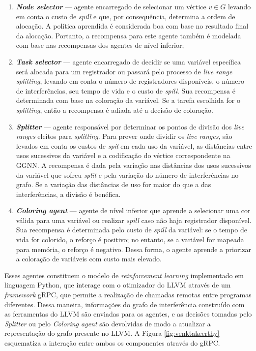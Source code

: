 \documentclass[
	12pt,				%
	openright,			%
	oneside,			%
	a4paper,			%
	tccpreliminar,			%
	]{ABNT-DC-UEL}
\begin{document}
\begin{enumerate}
    \item \textbf{\textit{Node selector}} --- agente encarregado de selecionar um vértice $v \in G$ levando em conta o custo de \textit{spill} e que, por consequência, determina a ordem de alocação. A política aprendida é considerada boa com base no resultado final da alocação. Portanto, a recompensa para este agente também é modelada com base nas recompensas dos agentes de nível inferior;

    \item \textbf{\textit{Task selector}} --- agente encarregado de decidir se uma variável específica será alocada para um registrador ou passará pelo processo de \textit{live range splitting}, levando em conta o número de registradores disponíveis, o número de interferências, seu tempo de vida e o custo de \textit{spill}. Sua recompensa é determinada com base na coloração da variável. Se a tarefa escolhida for o \textit{splitting}, então a recompensa é adiada até a decisão de coloração.

    \item \textbf{\textit{Splitter}} --- agente responsável por determinar os pontos de divisão dos \textit{live ranges} eleitos para \textit{splitting}. Para prever onde dividir os \textit{live ranges}, são levados em conta os custos de \textit{spil} em cada uso da variável, as distâncias entre usos sucessivos da variável e a codificação do vértice correspondente na GGNN. A recompensa é dada pela variação nas distâncias dos usos sucessivos da variável que sofreu \textit{split} e pela variação do número de interferências no grafo. Se a variação das distâncias de uso for maior do que a das interferências, a divisão é benéfica.

    \item \textbf{\textit{Coloring agent}} --- agente de nível inferior que aprende a selecionar uma cor válida para uma variável ou realizar \textit{spill} caso não haja registrador disponível. Sua recompensa é determinada pelo custo de \textit{spill} da variável: se o tempo de vida for colorido, o reforço é positivo; no entanto, se a variável for mapeada para memória, o reforço é negativo. Dessa forma, o agente aprende a priorizar a coloração de variáveis com custo mais elevado.
\end{enumerate}

Esses agentes constituem o modelo de \textit{reinforcement learning} implementado em linguagem Python, que interage com o otimizador do LLVM através de um \textit{framework} gRPC, que permite a realização de chamadas remotas entre programas diferentes. Dessa maneira, informações do grafo de interferência construído com as ferramentas do LLVM são enviadas para os agentes, e as decisões tomadas pelo \textit{Splitter} ou pelo \textit{Coloring agent} são devolvidas de modo a atualizar a representação do grafo presente no LLVM. A Figura \ref{fig:venktakeerthy} esquematiza a interação entre ambos os componentes através do gRPC.
\end{document}
